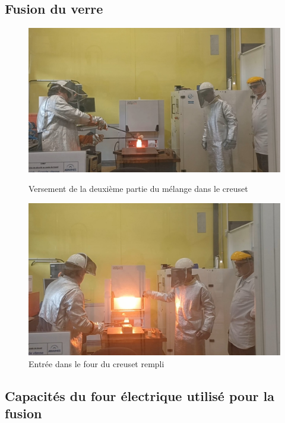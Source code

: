 \documentclass{article}
\begin{document}
\subsection{Fusion du verre}
\begin{figure}[h]
    \centering
    \begin{minipage}{0.45\textwidth}
        \centering
        \includegraphics[width=\textwidth]{photos/VideoCapture_20241202-155402.jpg}
        \caption{Versement de la deuxième partie du mélange dans le creuset}
    \end{minipage}
    \hspace{0.5cm}
    \begin{minipage}{0.45\textwidth}
        \centering
        \includegraphics[width=\textwidth]{photos/VideoCapture_20241202-155421.jpg}
        \caption{Entrée dans le four du creuset rempli}
    \end{minipage}
\end{figure}

\subsection{Capacités du four électrique utilisé pour la fusion}
\end{document}
